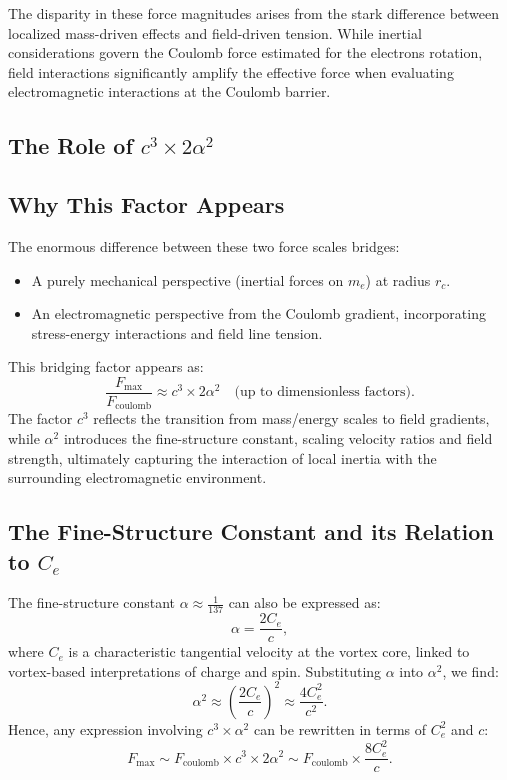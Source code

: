 The disparity in these force magnitudes arises from the stark difference between localized mass-driven effects and field-driven tension. While inertial considerations govern the Coulomb force estimated for the electron\rqs s rotation, field interactions significantly amplify the effective force when evaluating electromagnetic interactions at the Coulomb barrier.


\subsection*{The Role of $c^3 \times 2 \alpha^2$}


\subsection*{Why This Factor Appears}


The enormous difference between these two force scales bridges:
\begin{itemize}
\item A purely mechanical perspective (inertial forces on $m_e$) at radius $r_c$.
\item An electromagnetic perspective from the Coulomb gradient, incorporating stress-energy interactions and field line tension.
\end{itemize}
This bridging factor appears as:
\begin{equation*}
\frac{F_{\max}}{F_\text{coulomb}} \approx c^3 \times 2 \alpha^2 \quad \text{(up to dimensionless factors)}.
\end{equation*}
The factor $c^3$ reflects the transition from mass/energy scales to field gradients, while $\alpha^2$ introduces the fine-structure constant, scaling velocity ratios and field strength, ultimately capturing the interaction of local inertia with the surrounding electromagnetic environment.


\subsection*{The Fine-Structure Constant and its Relation to $C_e$}


The fine-structure constant $\alpha \approx \frac{1}{137}$ can also be expressed as:
\begin{equation*}
\alpha = \frac{2C_e}{c},
\end{equation*}
where $C_e$ is a characteristic tangential velocity at the vortex core, linked to vortex-based interpretations of charge and spin. Substituting $\alpha$ into $\alpha^2$, we find:
\begin{equation*}
\alpha^2 \approx \left(\frac{2C_e}{c}\right)^2 \approx \frac{4C_e^2}{c^2}.
\end{equation*}
Hence, any expression involving $c^3 \times \alpha^2$ can be rewritten in terms of $C_e^2$ and $c$:
\begin{equation*}
F_{\max} \sim F_\text{coulomb} \times c^3 \times 2\alpha^2 \sim F_\text{coulomb} \times \frac{8C_e^2}{c}.
\end{equation*}



